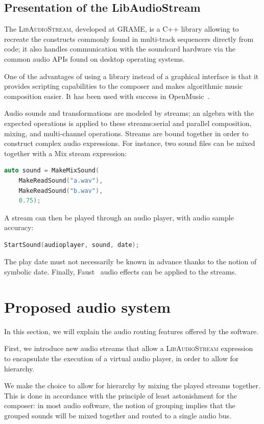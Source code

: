 \documentclass{article}
\newcommand*{\LibAudioStream}{\textsc{LibAudioStream}\xspace}
\begin{document}
\subsection{Presentation of the LibAudioStream}
The \LibAudioStream\cite{letzlibaudiostream}, developed at GRAME, is a C++ library allowing to recreate the constructs commonly found in multi-track sequencers directly from code; it also handles communication with the soundcard hardware via the common audio APIs found on desktop operating systems.

One of the advantages of using a library instead of a graphical interface is that it provides scripting capabilities to the composer and makes algorithmic music composition easier.
It has been used with success in OpenMusic~\cite{bouche2014programmation}.

Audio sounds and transformations are modeled by streams; an algebra with the expected operations is applied to these streams:serial and parallel composition, mixing, and multi-channel operations.
Streams are bound together in order to construct complex audio expressions.
For instance, two sound files can be mixed together with a Mix stream expression: 
\begin{lstlisting}[language=C++,columns=fullflexible,basicstyle=\ttfamily]
auto sound = MakeMixSound(
    MakeReadSound("a.wav"), 
    MakeReadSound("b.wav"), 
    0.75);
\end{lstlisting}
\newpage
A stream can then be played through an audio player, with audio sample accuracy:
 
\begin{lstlisting}[language=C++,columns=fullflexible,basicstyle=\ttfamily]
StartSound(audioplayer, sound, date);
\end{lstlisting}

The play date must not necessarily be known in advance thanks to the notion of symbolic date.
Finally, Faust~\cite{orlarey2009faust} audio effects can be applied to the streams.

\section{Proposed audio system}
In this section, we will explain the audio routing 
features offered by the software.

First, we introduce new audio streams that allow a \LibAudioStream
expression to encapsulate the execution of a virtual audio player, 
in order to allow for hierarchy.

We make the choice to allow for hierarchy by mixing the played streams together.
This is done in accordance with the principle of least astonishment\cite{seebach2001cranky} for the composer: 
in most audio software, the notion of grouping implies that the grouped sounds will be mixed 
together and routed to a single audio bus.
\end{document}
